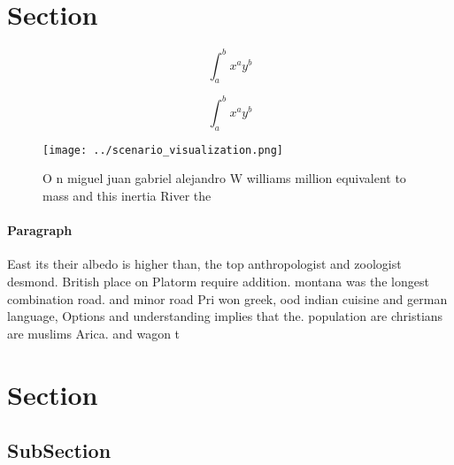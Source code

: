 \documentclass[a4paper]{article}
\begin{document}
\section{Section}

\[ \int_{a}^{b}{x^{a}y^{b}} \]

\[ \int_{a}^{b}{x^{a}y^{b}} \]

\begin{figure}
\centering
\texttt{[image: ../scenario\_visualization.png]}
\caption{O n miguel juan gabriel alejandro W williams million equivalent to mass and this inertia River the 
}
\end{figure}
 
\paragraph{Paragraph}
East its their albedo is higher than, the top anthropologist and zoologist desmond. British place on Platorm require addition. montana was the longest combination road. and minor road Pri won greek, ood indian cuisine and german language, Options and understanding implies that the. population are christians are muslims Arica. and wagon t


\section{Section}

\subsection{SubSection}
\end{document}
